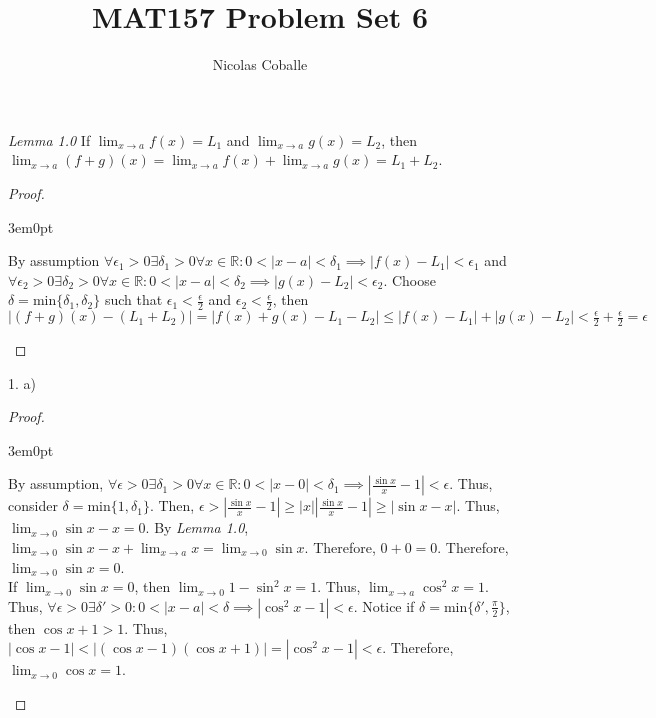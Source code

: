 \documentclass[11pt]{article}
\title{MAT157 Problem Set 6}
\author{Nicolas Coballe}
\newcommand{\R}{\mathbb{R}}
\newenvironment{myproof}
{\begin{proof} \begin{adjustwidth}{3em}{0pt}$ $\par\nobreak\ignorespaces}
{\end{adjustwidth} \end{proof}}
\begin{document}
\maketitle
\begin{flushleft}

\textit{Lemma 1.0} If $\lim_{x \to a} f(x) = L_1$ and $\lim_{x \to a} g(x) = L_2$, then $\lim_{x \to a} (f + g)(x) = \lim_{x \to a} f(x) + \lim_{x \to a} g(x) = L_1 + L_2$.
\begin{myproof}
By assumption $\forall \epsilon_1 > 0 \exists \delta_1 > 0 \forall x \in \R: 0 < |x-a| < \delta_1 \implies |f(x) - L_1| < \epsilon_1$ and $\forall \epsilon_2 > 0 \exists \delta_2 > 0 \forall x \in \R: 0 < |x-a| < \delta_2 \implies |g(x) - L_2| < \epsilon_2$. Choose $\delta = \text{min}\{ \delta_1, \delta_2 \}$ such that $\epsilon_1 < \frac{\epsilon}{2}$ and $\epsilon_2 < \frac{\epsilon}{2}$, then $|(f+g)(x) - (L_1+L_2)| = |f(x) + g(x) - L_1 - L_2| \leq |f(x) - L_1| + |g(x) - L_2| < \frac{\epsilon}{2} + \frac{\epsilon}{2} = \epsilon$
\end{myproof}





1. a)

\begin{myproof}

By assumption, $\forall \epsilon > 0 \exists \delta_1 > 0 \forall x \in \R: 0 < |x-0| < \delta_1 \implies |\frac{\sin x}{x} - 1| < \epsilon$. Thus, consider $\delta = \text{min}\{ 1, \delta_1 \}$. Then, $ \epsilon > |\frac{\sin x}{x} - 1| \geq |x||\frac{\sin x}{x} - 1| \geq |\sin x - x| $. Thus, $\lim_{x \to 0} \sin x - x = 0$. By \textit{Lemma 1.0}, $\lim_{x \to 0} \sin x - x + \lim_{x \to a} x = \lim_{x \to 0} \sin x$. Therefore, $0 + 0 = 0$. Therefore, $\lim_{x \to 0} \sin x = 0$. \\
\bigskip
If $\lim_{x \to 0} \sin x = 0$, then $\lim_{x \to 0} 1 - \sin^2 x = 1$. Thus, $\lim_{x \to a}\cos^2 x = 1$. Thus, $\forall \epsilon > 0 \exists \delta' > 0: 0<|x-a| < \delta \implies |\cos^2 x - 1| < \epsilon$. Notice if $\delta = \text{min} \{ \delta' , \frac{\pi}{2} \}$, then $\cos x + 1 > 1$. Thus, $|\cos x - 1| < |(\cos x -1)(\cos x + 1)| = |\cos^2 x - 1| < \epsilon$. Therefore, $\lim_{x \to 0} \cos x = 1$.


\end{myproof}
\end{flushleft}
\end{document}
